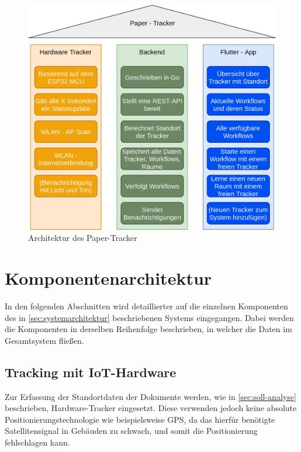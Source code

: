 \begin{figure}
	\includegraphics[width=\textwidth]{images/architecture_de.png}
	\centering
	\caption{Architektur des Paper-Tracker}
	\label{fig:architecture}
\end{figure}

\section{Komponentenarchitektur} \label{sec:komponentenarchitektur}

In den folgenden Abschnitten wird detaillierter auf die einzelnen Komponenten des in
\autoref{sec:systemarchitektur} beschriebenen Systems eingegangen.
Dabei werden die Komponenten in derselben Reihenfolge beschrieben, in welcher die Daten im
Gesamtsystem fließen.

\subsection{Tracking mit IoT-Hardware} \label{sec:tracking-hardware}

Zur Erfassung der Standortdaten der Dokumente werden, wie in \autoref{sec:soll-analyse}
beschrieben, Hardware-Tracker eingesetzt.
Diese verwenden jedoch keine absolute Positionierungstechnologie wie beispielsweise \gls{GPS}, da
das hierfür benötigte Satellitensignal in Gebäuden zu schwach, und somit die Positionierung
fehlschlagen kann.


